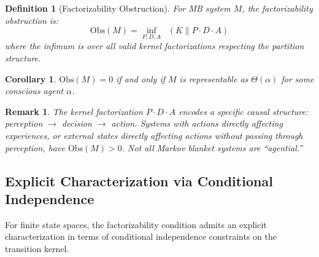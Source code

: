 \documentclass[11pt,a4paper]{article}
\newtheorem{corollary}[theorem]{Corollary}
\newtheorem{definition}[theorem]{Definition}
\newtheorem*{remark}{Remark}
\DeclareMathOperator{\DKL}{D_{KL}}
\begin{document}
\begin{definition}[Factorizability Obstruction]\label{def:obstruction}
For MB system $M$, the \emph{factorizability obstruction} is:
\[
\text{Obs}(M) = \inf_{P, D, A} \DKL(K \| P \cdot D \cdot A)
\]
where the infimum is over all valid kernel factorizations respecting the partition structure.
\end{definition}

\begin{corollary}\label{cor:obs}
$\text{Obs}(M) = 0$ if and only if $M$ is representable as $\Theta(\alpha)$ for some conscious agent $\alpha$.
\end{corollary}

\begin{remark}
The kernel factorization $P \cdot D \cdot A$ encodes a specific causal structure: perception $\to$ decision $\to$ action. Systems with actions directly affecting experiences, or external states directly affecting actions without passing through perception, have $\text{Obs}(M) > 0$. Not all Markov blanket systems are ``agential.''
\end{remark}

\subsection{Explicit Characterization via Conditional Independence}

For finite state spaces, the factorizability condition admits an explicit characterization in terms of conditional independence constraints on the transition kernel.
\end{document}
